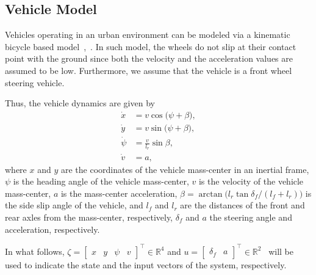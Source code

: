 \subsection{Vehicle Model}
\label{sub_sec:vehicle_model}
%
Vehicles operating in an urban environment can be modeled via a kinematic bicycle based model~\cite{bicycle_Borrelli},~\cite{Bicycle_model_2}. In such model, the wheels do not slip at their contact point with the ground since both the velocity and the acceleration values are assumed to be low. Furthermore,  we assume that the vehicle is a front wheel steering vehicle.

Thus, the vehicle dynamics are given by~\cite{bicycle_Borrelli}
%
\begin{subequations}
	\label{eq:vehicmodel}
	\begin{align}
		\dot{x} &= v \cos \big(\psi+\beta\big),\\
		\dot{y}  &= v \sin \big(\psi+\beta\big),\\
		\dot{\psi}  &= \frac{v}{l_{r}} \sin \beta,\\
		\dot{v}  &= a,
	\end{align}
\end{subequations}
where $x$ and $y$ are the coordinates of the vehicle mass-center in an inertial frame, $\psi$ is the heading angle of the vehicle mass-center, $v$ is the velocity of the vehicle mass-center, $a$ is the mass-center acceleration, $\beta =\arctan\Big(l_{r}\tan \delta_f\slash(l_{f}+l_{r}) \Big)$ is the side slip angle of the vehicle, and $l_f$ and $l_r$ are the distances of the front and rear axles from the mass-center, respectively, $\delta_f$  and  $a$ the steering angle and acceleration, respectively. 

In what follows, $\zeta=\begin{bmatrix}x & y & \psi & v\end{bmatrix}^\top \in \mathbb{R}^{4 } $ and \mbox{$u=\begin{bmatrix}\delta_f & a\end{bmatrix}^\top \in \mathbb{R}^{2 }$ } will be used to indicate the state and the input vectors of the system, respectively.

